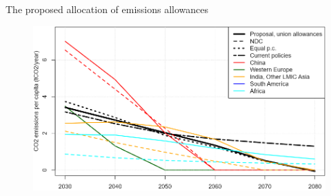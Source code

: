 \documentclass[aspectratio=169,xcolor=dvipsnames, 11pt,mathserif]{beamer}
\begin{document}
\begin{frame}{The proposed allocation of emissions allowances}
    \begin{table}[h]
        \caption{Carbon budget over 2030--2080 (in GtCO$_\text{2}$)} \vspace{-.4cm}
      \end{table}
    \begin{figure}
        \centering %
        \includegraphics[height=.6\textheight]{../figures/policies/fossil_free_union_emission_trajectories.png} 
    \end{figure}
\end{frame}
\end{document}
